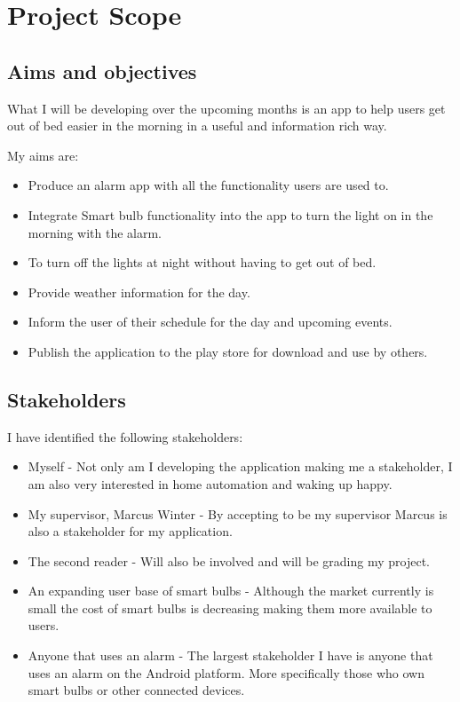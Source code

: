 \section{Project Scope}\label{project-scope}

\subsection{Aims and objectives}\label{aims-and-objectives}

What I will be developing over the upcoming months is an app to help
users get out of bed easier in the morning in a useful and information
rich way.

My aims are:

\begin{itemize}
\tightlist
\item
  Produce an alarm app with all the functionality users are used to.
\item
  Integrate Smart bulb functionality into the app to turn the light on
  in the morning with the alarm.
\item
  To turn off the lights at night without having to get out of bed.
\item
  Provide weather information for the day.
\item
  Inform the user of their schedule for the day and upcoming events.
\item
  Publish the application to the play store for download and use by
  others.
\end{itemize}

\subsection{Stakeholders}\label{stakeholders}

I have identified the following stakeholders:

\begin{itemize}
\item
  Myself - Not only am I developing the application making me a
  stakeholder, I am also very interested in home automation and waking
  up happy.
\item
  My supervisor, Marcus Winter - By accepting to be my supervisor Marcus
  is also a stakeholder for my application.
\item
  The second reader - Will also be involved and will be grading my
  project.
\item
  An expanding user base of smart bulbs - Although the market currently
  is small the cost of smart bulbs is decreasing making them more
  available to users.
\item
  Anyone that uses an alarm - The largest stakeholder I have is anyone
  that uses an alarm on the Android platform. More specifically those
  who own smart bulbs or other connected devices.
\end{itemize}

